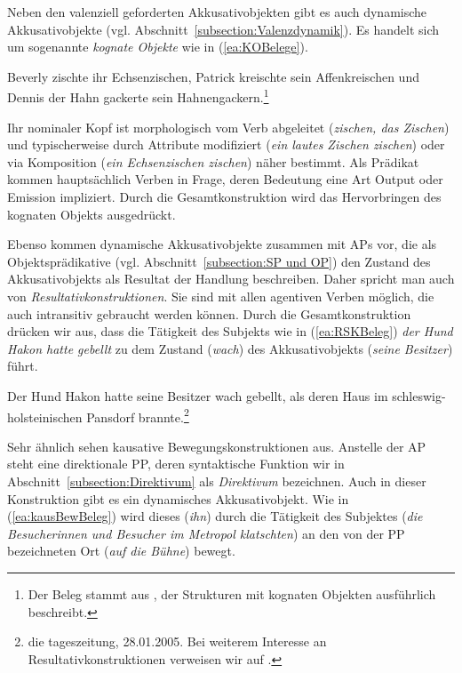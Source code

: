 Neben den valenziell geforderten Akkusativobjekten gibt es auch dynamische Akkusativobjekte (vgl. Abschnitt~\ref{subsection:Valenzdynamik}). Es handelt sich \zB um sogenannte \textit{kognate Objekte} wie in (\ref{ea:KOBelege}). 

\ea \label{ea:KOBelege} Beverly zischte ihr Echsenzischen, Patrick kreischte sein Affenkreischen und Dennis der Hahn gackerte sein Hahnengackern.\footnote{Der Beleg stammt aus \citet[361]{Felfe2018}, der Strukturen mit kognaten Objekten ausführlich beschreibt.}
\z 

Ihr nominaler Kopf ist morphologisch vom Verb abgeleitet (\textit{zischen, das Zischen}) und typischerweise durch Attribute modifiziert (\textit{ein lautes Zischen zischen}) oder via Komposition (\textit{ein Echsenzischen zischen}) näher bestimmt. Als Prädikat kommen hauptsächlich Verben in Frage, deren Bedeutung eine Art Output oder Emission impliziert. Durch die Gesamtkonstruktion wird das Hervorbringen des kognaten Objekts ausgedrückt.

Ebenso kommen dynamische Akkusativobjekte zusammen mit APs vor, die als Objektsprädikative (vgl. Abschnitt~\ref{subsection:SP und OP}) den Zustand des Akkusativobjekts als Resultat der Handlung beschreiben. Daher spricht man auch von \textit{Resultativkonstruktionen}. Sie sind mit allen agentiven Verben möglich, die auch intransitiv gebraucht werden können. Durch die Gesamtkonstruktion drücken wir aus, dass die Tätigkeit des Subjekts wie in (\ref{ea:RSKBeleg}) \textit{der Hund Hakon hatte gebellt} zu dem Zustand (\textit{wach}) des Akkusativobjekts (\textit{seine Besitzer}) führt.

\ea \label{ea:RSKBeleg} Der Hund Hakon hatte seine Besitzer wach gebellt, als deren Haus im schleswig-holsteinischen Pansdorf brannte.\footnote{die tageszeitung, 28.01.2005. Bei weiterem Interesse an Resultativkonstruktionen verweisen wir auf \citet{Felfe2012}.}
\z 

Sehr ähnlich sehen kausative Bewegungskonstruktionen aus. Anstelle der AP steht eine direktionale PP, deren syntaktische Funktion wir in Abschnitt~\ref{subsection:Direktivum} als \textit{Direktivum} bezeichnen. Auch in dieser Konstruktion gibt es ein dynamisches Akkusativobjekt. Wie in (\ref{ea:kausBewBeleg}) wird dieses (\textit{ihn}) durch die Tätigkeit des Subjektes (\textit{die Besucherinnen und Besucher im Metropol klatschten}) an den von der PP bezeichneten Ort (\textit{auf die Bühne}) bewegt.

